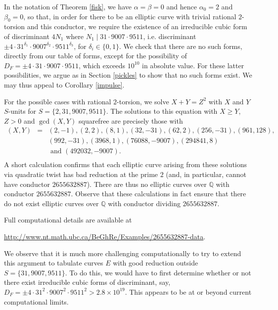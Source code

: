 In the notation of Theorem \ref{fisk}, we have $\alpha=\beta=0$ and hence $\alpha_0 =2$ and $\beta_0 =0$, so that, in order for there to be an elliptic curve with trivial rational $2$-torsion and this conductor, we require the existence of an irreducible cubic form of discriminant $4 N_1$ where 
$N_1 \mid  31 \cdot 9007 \cdot 9511$,
i.e. discriminant $\pm 4 \cdot 31^{\delta_1} \cdot 9007^{\delta_2} \cdot 9511^{\delta_3}$, for $\delta_i \in \{ 0, 1 \}$. We check that there are no such forms, directly from our table of forms, except for the possibility of $D_F = \pm 4 \cdot 31 \cdot 9007 \cdot 9511$, which exceeds $10^{10}$ in absolute value. For these latter possibilities, we argue as in Section \ref{pickles} to show that no such forms exist. We may thus appeal to Corollary \ref{impulse}.

For the possible cases with rational $2$-torsion, we solve $X+Y=Z^2$ with $X$ and $Y$ $S$-units for $S = \{ 2, 31, 9007, 9511 \}$. The solutions to this equation with $X \geq Y$, $Z > 0$ and $\gcd (X,Y)$ squarefree are precisely those with
$$
\begin{array}{lll}
(X,Y) &= &  (2,-1), (2,2), (8,1), (32,-31), (62,2), (256,-31), (961,128), \\
& & (992,-31), (3968,1), (76088,-9007), (294841, 8)\\
& & \mbox{ and } (492032,-9007).  \\
\end{array}
$$
A short calculation confirms that each elliptic curve arising from these solutions via quadratic twist has bad reduction at the prime $2$ (and, in particular, cannot have conductor $2655632887$). There are thus no elliptic curves over $\mathbb{Q}$ with conductor $2655632887$.
Observe that these calculations in fact ensure that there do not exist elliptic curves over $\mathbb{Q}$ with conductor dividing $2655632887$. 

Full computational details are available at
\begin{center}
\url{http://www.nt.math.ubc.ca/BeGhRe/Examples/2655632887-data}.
\end{center}
We observe that it is much more challenging computationally to try to extend this argument to tabulate curves $E$ with good reduction outside 
$S = \{ 31, 9007, 9511 \}$. To do this, we would have to first determine whether or not there exist irreducible cubic forms of discriminant, say,
$D_F = \pm 4 \cdot 31^2 \cdot 9007^2 \cdot 9511^2 > 2.8 \times 10^{19}$. This appears to be at or beyond current computational limits.

